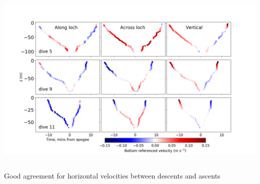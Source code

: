 \documentclass[unknownkeysallowed,usepdftitle=false]{beamer}
\begin{document}
\begin{frame}\label{3_dives}
\vspace*{-1.2mm}    
\begin{center}
\includegraphics[trim=0 0 0 50,clip,width=\paperwidth]{figure/diveclimb_vel9.png}
\end{center}

\vspace*{-5.2mm}
\begin{columns}
\begin{column}[t]{0.9\textwidth}
Good agreement for horizontal velocities between descents and ascents
\end{column}
\end{columns}



  
\end{frame}
\end{document}
